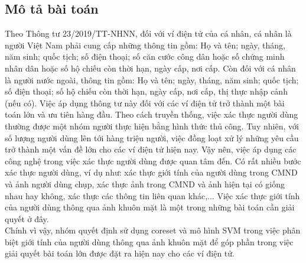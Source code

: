 \documentclass[a4paper, 12pt, oneside]{report}
\begin{document}
\subsection{Mô tả bài toán}
Theo Thông tư 23/2019/TT-NHNN, đối với ví điện tử của cá nhân, cá nhân là người Việt Nam phải cung cấp những thông tin gồm: Họ và tên; ngày, tháng, năm sinh; quốc tịch; số điện thoại; số căn cước công dân hoặc số chứng minh nhân dân hoặc số hộ chiếu còn thời hạn, ngày cấp, nơi cấp. Còn đối với cá nhân là người nước ngoài, thông tin gồm: Họ và tên; ngày, tháng, năm sinh; quốc tịch; số điện thoại; số hộ chiếu còn thời hạn, ngày cấp, nơi cấp, thị thực nhập cảnh (nếu có). Việc áp dụng thông tư này đối với các ví điện tử trở thành một bài toán lớn và ưu tiên hàng đầu. Theo cách truyền thống, việc xác thực người dùng thường được một nhóm người thực hiện bằng hình thức thủ công. Tuy nhiên, với số lượng người dùng lên tới hàng triệu người, việc đồng loạt xử lý những yêu cầu trở thành một vấn đề lớn cho các ví điện tử hiện nay. Vậy nên, việc áp dụng các công nghệ trong việc xác thực người dùng được quan tâm đến. Có rất nhiều bước xác thực người dùng, ví dụ như: xác thực giới tính của người dùng trong CMND và ảnh người dùng chụp, xác thực ảnh trong CMND và ảnh hiện tại có giống nhau hay không, xác thực các thông tin liên quan khác,... Việc xác thực giới tính của người dùng thông qua ảnh khuôn mặt là một trong những bài toán cần giải quyết ở đây.\\
Chính vì vậy, nhóm quyết định sử dụng coreset và mô hình SVM trong việc phân biệt giới tính của người dùng thông qua ảnh khuôn mặt để góp phần trong việc giải quyết bài toán lớn được đặt ra hiện nay cho các ví điện tử.
\end{document}
